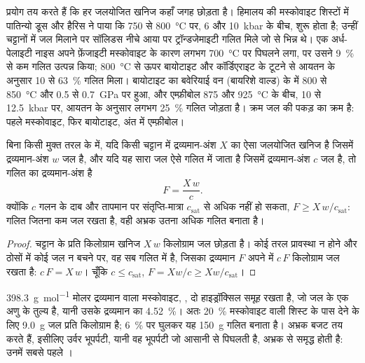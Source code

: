 प्रयोग तय करते हैं कि हर जलयोजित खनिज कहाँ जगह छोड़ता है। हिमालय की मस्कोवाइट शिस्टों में
पातिन्यो डूस और हैरिस ने पाया कि  750 से
\qty{800}{\celsius} पर, 6 और \qty{10}{kbar} के बीच, शुरू होता है; उन्हीं चट्टानों में जल मिलाने पर
सॉलिडस नीचे आया पर ट्रॉन्डजेमाइटी गलित मिले जो  से भिन्न थे। एक अर्ध-पेलाइटी नाइस
अपने फ़ेंजाइटी मस्कोवाइट के कारण लगभग \qty{700}{\celsius} पर पिघलने लगा, पर उसने
\qty{9}{\percent} से कम गलित उत्पन्न किया; \qty{800}{\celsius} से ऊपर बायोटाइट और
कॉर्डिएराइट के टूटने से आयतन के अनुसार 10 से \qty{63}{\percent} गलित मिला। बायोटाइट का 
बवेरियाई वन (बायरिशे वाल्ड) के  में 800 से \qty{850}{\celsius} और 0.5 से \qty{0.7}{GPa} पर हुआ,
और एम्फ़ीबोल 875
और \qty{925}{\celsius} के बीच, 10 से \qty{12.5}{kbar} पर, आयतन के अनुसार लगभग \qty{25}{\percent} गलित जोड़ता है। क्रम जल की पकड़ का क्रम है:
पहले मस्कोवाइट, फिर बायोटाइट, अंत में एम्फ़ीबोल।

\begin{proposition}[जल से सीमित गलन-अंश]\label{prop:b2:crustal-melting:water}
बिना किसी मुक्त तरल के  में, यदि किसी चट्टान में द्रव्यमान-अंश $X$ का
ऐसा जलयोजित खनिज है जिसमें द्रव्यमान-अंश $w$ जल है, और यदि यह सारा जल ऐसे
गलित में जाता है जिसमें द्रव्यमान-अंश $c$ जल है, तो गलित का द्रव्यमान-अंश है
\[F = \frac{X\,w}{c}.\]
क्योंकि $c$ गलन के दाब और तापमान पर संतृप्ति-मात्रा $c_{\mathrm{sat}}$ से अधिक नहीं हो
सकता, $F \ge X\,w/c_{\mathrm{sat}}$: गलित जितना कम जल रखता है,
वही अभ्रक उतना अधिक गलित बनाता है।
\end{proposition}

\begin{proof}
चट्टान के प्रति किलोग्राम खनिज $X\,w$ किलोग्राम जल छोड़ता है। कोई तरल प्रावस्था न होने
और ठोसों में कोई जल न बचने पर, वह सब गलित में है, जिसका द्रव्यमान $F$ अपने में $c\,F$
किलोग्राम जल रखता है: $c\,F = X\,w$। चूँकि $c \le c_{\mathrm{sat}}$, $F = Xw/c \ge
Xw/c_{\mathrm{sat}}$।
\end{proof}

\qty{398.3}{\gram\per\mole} मोलर द्रव्यमान वाला मस्कोवाइट, , दो
हाइड्रॉक्सिल समूह रखता है, जो जल के एक अणु के तुल्य है, यानी उसके द्रव्यमान का \qty{4.52}{\percent}।
अतः \qty{20}{\percent} मस्कोवाइट वाली शिस्ट के पास देने के लिए \qty{9.0}{\gram} जल
प्रति किलोग्राम है; \qty{6}{\percent} पर घुलकर यह \qty{150}{\gram}
गलित बनाता है। अभ्रक बजट तय करते हैं, इसीलिए उर्वर भूपर्पटी, यानी वह भूपर्पटी जो आसानी से पिघलती है,
अभ्रक से समृद्ध होती है: उनमें सबसे पहले ।

